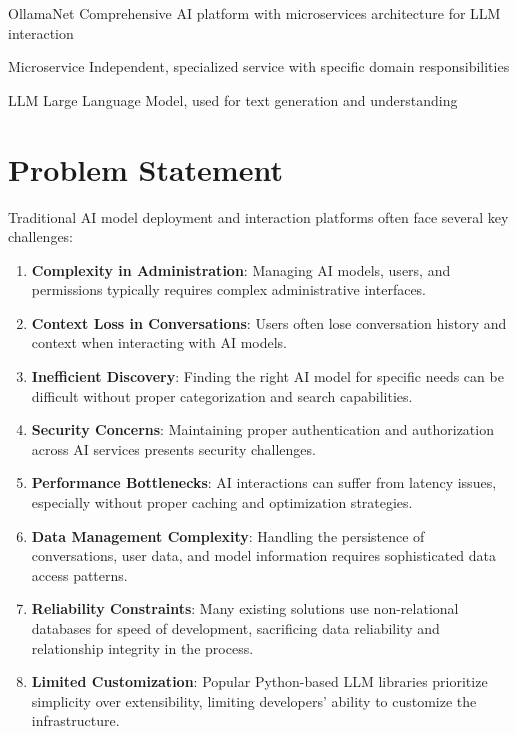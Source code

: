 \begin{terminologybox}
\item[OllamaNet] Comprehensive AI platform with microservices architecture for LLM interaction
\item[Microservice] Independent, specialized service with specific domain responsibilities  
\item[LLM] Large Language Model, used for text generation and understanding
\end{terminologybox}

\section{Problem Statement}

Traditional AI model deployment and interaction platforms often face several key challenges:

\begin{enumerate}
    \item \textbf{Complexity in Administration}: Managing AI models, users, and permissions typically requires complex administrative interfaces.
    \item \textbf{Context Loss in Conversations}: Users often lose conversation history and context when interacting with AI models.
    \item \textbf{Inefficient Discovery}: Finding the right AI model for specific needs can be difficult without proper categorization and search capabilities.
    \item \textbf{Security Concerns}: Maintaining proper authentication and authorization across AI services presents security challenges.
    \item \textbf{Performance Bottlenecks}: AI interactions can suffer from latency issues, especially without proper caching and optimization strategies.
    \item \textbf{Data Management Complexity}: Handling the persistence of conversations, user data, and model information requires sophisticated data access patterns.
    \item \textbf{Reliability Constraints}: Many existing solutions use non-relational databases for speed of development, sacrificing data reliability and relationship integrity in the process.
    \item \textbf{Limited Customization}: Popular Python-based LLM libraries prioritize simplicity over extensibility, limiting developers' ability to customize the infrastructure.
\end{enumerate}

